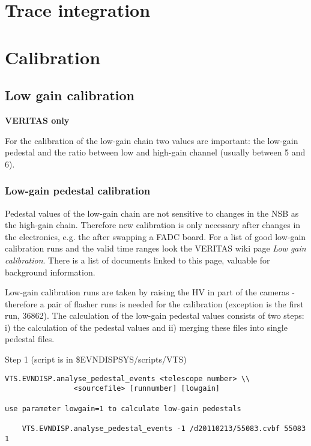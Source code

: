 \documentclass[titlepage,a4paper,twoside,11pt]{report}
\begin{document}
\section{Trace integration}

\section{Calibration}

\subsection{Low gain calibration}

{\bf\color{red}VERITAS only}

For the calibration of the low-gain chain two values are important: the low-gain pedestal and the ratio between low and high-gain channel (usually between 5 and 6).

\subsubsection{Low-gain pedestal calibration}

Pedestal values of the low-gain chain are not sensitive to changes in the NSB as the high-gain chain.
Therefore new calibration is only necessary after changes in the electronics, e.g. the after swapping a FADC board.
For a list of good low-gain calibration runs and the valid time ranges look the VERITAS wiki page {\it Low gain calibration}.
There is a list of documents linked to this page, valuable for background information.

Low-gain calibration runs are taken by raising the HV in part of the cameras - therefore a pair of flasher runs is needed for
the calibration (exception is the first run, 36862).
The calculation of the low-gain pedestal values consists of two steps: 
i) the calculation of the pedestal values and ii) merging these files into single pedestal files.

Step 1 (script is in \$EVNDISPSYS/scripts/VTS)
\begin{lstlisting}
VTS.EVNDISP.analyse_pedestal_events <telescope number> \\
				<sourcefile> [runnumber] [lowgain]

use parameter lowgain=1 to calculate low-gain pedestals

    VTS.EVNDISP.analyse_pedestal_events -1 /d20110213/55083.cvbf 55083 1

\end{lstlisting}
\end{document}
